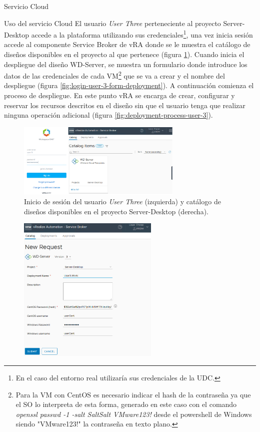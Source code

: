 \begin{subsection}{Servicio Cloud}
\begin{subsubsection}{Uso del servicio Cloud}
        El usuario \textit{User Three} perteneciente al proyecto Server-Desktop accede a la plataforma utilizando sus credenciales\footnote{En el caso del entorno real utilizaría sus credenciales de la UDC.}, una vez inicia sesión accede al componente Service Broker de vRA donde se le muestra el catálogo de diseños disponibles en el proyecto al que pertenece (figura \ref{fig:login-user-3-catalog}). Cuando inicia el despliegue del diseño WD-Server, se muestra un formulario donde introduce los datos de las credenciales de cada VM\footnote{Para la VM con CentOS es necesario indicar el hash de la contraseña ya que el SO lo interpreta de esta forma, generado en este caso con el comando \textit{openssl passwd -1 -salt SaltSalt VMware123!} desde el powershell de Windows siendo "VMware123!" la contraseña en texto plano.} que se va a crear y el nombre del despliegue (figura \ref{fig:login-user-3-form-deployment}). A continuación comienza el proceso de despliegue. En este punto vRA se encarga de crear, configurar y reservar los recursos descritos en el diseño sin que el usuario tenga que realizar ninguna operación adicional (figura \ref{fig:deployment-process-user-3}).
        \begin{figure}[h]
            \centering
            \includegraphics[width=0.7\textwidth]{imaxes/pruebaconcepto/vrealize/login-user-3-credentials.png}
            \caption{Inicio de sesión del usuario \textit{User Three} (izquierda) y catálogo de diseños disponibles en el proyecto Server-Desktop (derecha).}
            \label{fig:login-user-3-catalog}
        \end{figure}
        \FloatBarrier
        \begin{figure}[h]
            \centering
            \includegraphics[width=0.6\textwidth]{imaxes/pruebaconcepto/vrealize/deployment-user-3-Windows.png}

\end{figure}
\end{subsubsection}
\end{subsection}
